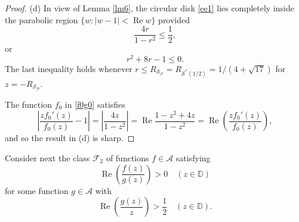 \documentclass{amsart}
\begin{document}
\begin{proof}
(d) In view of Lemma \ref{lm6}, the  circular disk \eqref{ee1} lies completely  inside the parabolic region $\{w:|w-1|<\operatorname{Re} w\}$ provided
\[ \frac{4r}{1-r^2}\leq \frac{1}{2},\]
or
 \begin{equation*}
 r^2+8r-1\leq0.
 \end{equation*}
The last inequality holds whenever  $r\leq R_{\mathcal{S}_{\mathcal{P}}}=R_{\mathcal{S}^*{( 1/2 )}}= 1/(4+\sqrt{17})$  for $z=-R_{\mathcal{S}_{\mathcal{P}}}$.

The function $f_0$ in \eqref{f0g0} satisfies
\[\left|\frac{zf_0'(z)}{f_0(z)}-1\right|=\left|\frac{4z}{1-z^2}\right|=
\operatorname{Re}\frac{1-z^2+4z}{1-z^2}=\operatorname{Re}\left(\frac{zf_0'(z)}{f_0(z)}\right),\]
and so the result in (d) is sharp.
\end{proof}

Consider next the class $\mathcal{F}_2$  of functions $f\in \mathcal{A}$ satisfying
\[  \operatorname{Re}\left(\frac{f(z)}{g(z)}\right)>0\quad ( z\in \mathbb{D})\]
for some function $g\in \mathcal{A}$ with
 \[  \operatorname{Re} \left(\frac{g(z)}{z}\right)>\frac{1}{2}\quad ( z\in \mathbb{D}). \]
\end{document}
